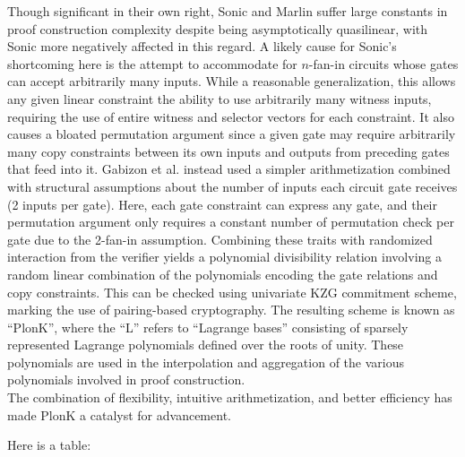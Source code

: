 \noindent Though significant in their own right, Sonic and Marlin suffer large constants in proof construction complexity despite being asymptotically quasilinear, with Sonic more negatively affected in this regard. A likely cause for Sonic's shortcoming here is the attempt to accommodate for $n$-fan-in circuits whose gates can accept arbitrarily many inputs. While a reasonable generalization, this allows any given linear constraint the ability to use arbitrarily many witness inputs, requiring the use of entire witness and selector vectors for each constraint. It also causes a bloated permutation argument since a given gate may require arbitrarily many copy constraints between its own inputs and outputs from preceding gates that feed into it. Gabizon et al. instead used a simpler arithmetization combined with structural assumptions about the number of inputs each circuit gate receives (2 inputs per gate). Here, each gate constraint can express any gate, and their permutation argument only requires a constant number of permutation check per gate due to the 2-fan-in assumption. Combining these traits with randomized interaction from the verifier yields a polynomial divisibility relation involving a random linear combination of the polynomials encoding the gate relations and copy constraints. This can be checked using univariate KZG commitment scheme, marking the use of pairing-based cryptography. The resulting scheme is known as ``PlonK'', where the ``L'' refers to ``Lagrange bases'' consisting of sparsely represented Lagrange polynomials defined over the roots of unity. These polynomials are used in the interpolation and aggregation of the various polynomials involved in proof construction.\\

\noindent The combination of flexibility, intuitive arithmetization, and better efficiency has made PlonK a catalyst for advancement.

\noindent Here is a table:

